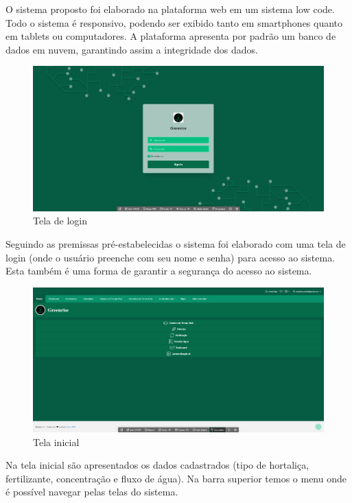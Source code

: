 O sistema proposto foi elaborado na plataforma web em um sistema low code. Todo o sistema é responsivo, podendo ser exibido tanto em smartphones quanto em tablets ou computadores. A plataforma apresenta por padrão um banco de dados em nuvem, garantindo assim a integridade dos dados. 
\clearpage
\begin{figure}[!h]
\centering
\caption{Tela de login}
\label{fig:picture18}
\includegraphics[scale=0.2]{Illustrations/Tela_login.png}
\end{figure}
Seguindo as premissas pré-estabelecidas o sistema foi elaborado com uma tela de login (onde o usuário preenche com seu nome e senha) para acesso ao sistema. Esta também é uma forma de garantir a segurança do acesso ao sistema.
\begin{figure}[!h]
\centering
\caption{Tela inicial}
\label{fig:picture19}
\includegraphics[scale=0.2]{Illustrations/Tela_home.png}
\end{figure}

Na tela inicial são apresentados os dados cadastrados (tipo de hortaliça, fertilizante, concentração e fluxo de água). Na barra superior temos o menu onde é possível navegar pelas telas do sistema.

